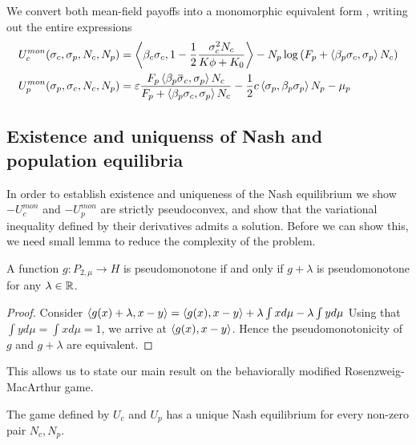 We convert both mean-field payoffs into a monomorphic equivalent form , writing out the entire expressions
\begin{align}
  \label{eq:mon_eq_forms}
  U_c^{mon}(\sigma_c, \sigma_p, N_c, N_p) &= \ip{\beta_c \sigma_c}{1-\frac{1}{2}\frac{\sigma_c^2 N_c}{K\phi + K_0}} - N_p\log\pa{F_p + \ip{\beta_p \sigma_c}{\sigma_p} N_c} \\
  U_p^{mon}(\sigma_p, \sigma_c, N_c, N_p) &= \epsilon \frac{F_p \ip{\beta_p \overbar{\sigma}_c}{\sigma_p} N_c}{F_p + \ip{\beta_p \sigma_c}{\sigma_p} N_c} - \frac{1}{2}c \ip{\sigma_p}{\beta_p \sigma_p}N_p  - \mu_p
\end{align}
\subsection{Existence and uniquenss of Nash and population equilibria}
In order to establish existence and uniqueness of the Nash equilibrium we show $-U_c^{mon}$ and $-U_p^{mon}$ are strictly pseudoconvex, and show that the variational inequality defined by their derivatives admits a solution. Before we can show this, we need small lemma to reduce the complexity of the problem.
\begin{lemma}
  \label{lem:pseudo_reduc}
  A function $g: P_{2,\mu} \to H$ is pseudomonotone if and only if $g+\lambda$ is pseudomonotone for any $\lambda \in \mathbb{R}$.
\end{lemma}
\begin{proof}
  Consider $\left \langle g(x)+\lambda,x-y \right \rangle=\left \langle g(x),x-y \right \rangle+\lambda \int x d\mu - \lambda \int y d\mu$
  Using that $\int y d\mu = \int x d\mu = 1$, we arrive at  $\left \langle g(x),x-y \right \rangle$.
  Hence the pseudomonotonicity of $g$ and $g+\lambda$ are equivalent.
\end{proof}
This allows us to state our main result on the behaviorally modified Rosenzweig-MacArthur game.
\begin{proposition}
  \label{prop:exist_unique_nash}
  The game defined by $U_c$ and $U_p$ has a unique Nash equilibrium for every non-zero pair $N_c,N_p$.
\end{proposition}

